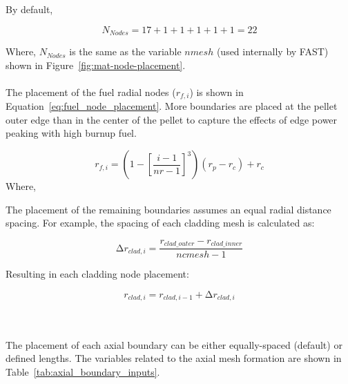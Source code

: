 By default,

\begin{equation}
    \label{eq:default_num_radial_nodes}
    N_{Nodes} = 17 + 1 + 1 + 1 + 1 + 1 = 22
\end{equation}

Where, \(N_{Nodes}\) is the same as the variable $nmesh$ (used internally by FAST) shown in
Figure~\ref{fig:mat-node-placement}.
\\
\\
The placement of the fuel radial nodes (\(r_{f,i}\)) is shown in
Equation~\ref{eq:fuel_node_placement}.  More boundaries are placed at the pellet outer edge than in
the center of the pellet to capture the effects of edge power peaking with high burnup fuel.

\begin{equation}
    \label{eq:fuel_node_placement}
    r_{f,i} = \left( 1 - \left\lbrack \frac{i - 1}{nr - 1} \right\rbrack^{3} \right)\left( r_{p} - r_{c} \right) + r_{c}
\end{equation}
Where,

The placement of the remaining boundaries assumes an equal radial distance spacing. For example, the
spacing of each cladding mesh is calculated as:

\begin{equation}
    \label{eq:clad_mesh_spacing}
    \mathrm{\Delta}r_{clad,i} = \frac{r_{clad\_ outer} - r_{clad\_ inner}}{ncmesh - 1}
\end{equation}

Resulting in each cladding node placement:

\begin{equation}
    \label{eq:clad_node_placement}
    r_{clad,i} = r_{clad,i - 1} + {\mathrm{\Delta}r}_{clad,i}
\end{equation}

\\
\\
The placement of each axial boundary can be either equally-spaced (default) or defined lengths. The
variables related to the axial mesh formation are shown in Table~\ref{tab:axial_boundary_inputs}.

